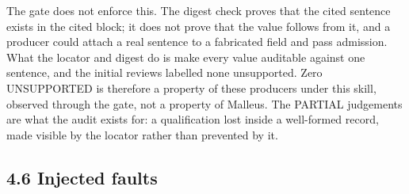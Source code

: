 The gate does not enforce this. The digest check proves that the cited sentence exists in the cited block; it does not prove that the value follows from it, and a producer could attach a real sentence to a fabricated field and pass admission. What the locator and digest do is make every value auditable against one sentence, and the initial reviews labelled none unsupported. Zero UNSUPPORTED is therefore a property of these producers under this skill, observed through the gate, not a property of Malleus. The PARTIAL judgements are what the audit exists for: a qualification lost inside a well-formed record, made visible by the locator rather than prevented by it.

\subsection*{4.6 Injected faults}

